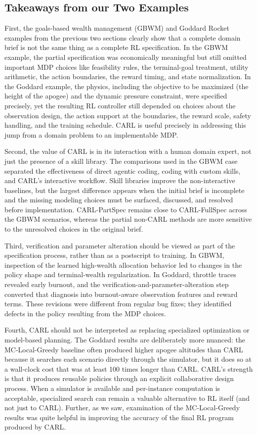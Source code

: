 \documentclass[mnsc,sglanonrev]{informs4}
\begin{document}
\subsection{Takeaways from our Two Examples}

First, the goals-based wealth management (GBWM) and Goddard Rocket examples from the previous two sections clearly show that a complete domain brief is not the same thing as a complete RL specification. In the GBWM example, the partial specification was economically meaningful but still omitted important MDP choices like feasibility rules, the terminal-goal treatment, utility arithmetic, the action boundaries, the reward timing, and state normalization. In the Goddard example, the physics, including the objective to be maximized (the height of the apogee) and the dynamic pressure constraint, were specified precisely, yet the resulting RL controller still depended on choices about the observation design, the action support at the boundaries, the reward scale, safety handling, and the training schedule. CARL is useful precisely in addressing this jump from a domain problem to an implementable MDP.

Second, the value of CARL is in its interaction with a human domain expert, not just the presence of a skill library. The comparisons used in the GBWM case separated the effectiveness of direct agentic coding, coding with custom skills, and CARL's interactive workflow. Skill libraries improve the non-interactive baselines, but the largest difference appears when the initial brief is incomplete and the missing modeling choices must be surfaced, discussed, and resolved before implementation. CARL-PartSpec remains close to CARL-FullSpec across the GBWM scenarios, whereas the partial non-CARL methods are more sensitive to the unresolved choices in the original brief.

Third, verification and parameter alteration should be viewed as part of the specification process, rather than as a postscript to training. In GBWM, inspection of the learned high-wealth allocation behavior led to changes in the policy shape and terminal-wealth regularization. In Goddard, throttle traces revealed early burnout, and the verification-and-parameter-alteration step converted that diagnosis into burnout-aware observation features and reward terms. These revisions were different from regular bug fixes; they identified defects in the policy resulting from the MDP choices.

Fourth, CARL should not be interpreted as replacing specialized optimization or model-based planning. The Goddard results are deliberately more nuanced: the MC-Local-Greedy baseline often produced higher apogee altitudes than CARL because it searches each scenario directly through the simulator, but it does so at a wall-clock cost that was at least 100 times longer than CARL. CARL's strength is that it produces reusable policies through an explicit collaborative design process. When a simulator is available and per-instance computation is acceptable, specialized search can remain a valuable alternative to RL itself (and not just to CARL). Further, as we saw, examination of the MC-Local-Greedy results was quite helpful in improving the accuracy of the final RL program produced by CARL.
\end{document}
